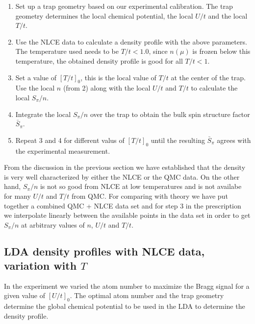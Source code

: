\documentclass[11pt,letter]{article}
\begin{document}
\begin{enumerate}

  \item Set up a trap geometry based on our experimental calibration.  The trap
geometry determines the local chemical potential, the local $U/t$ and the local
$T/t$. 

  \item Use the NLCE data to calculate a density profile with the above
parameters.  The temperature used needs to be $T/t < 1.0$, since $n(\mu)$ is
frozen below this temperature, the obtained density profile is good for all
$T/t<1$. 

  \item Set a value of $[T/t]_{0}$, this is the local value of $T/t$ at the
center of the trap.  Use the local $n$ (from 2) along with the local $U/t$ and
$T/t$ to calculate the local $S_{\pi}/n$.   
 
  \item Integrate the local $S_{\pi}/n$ over the trap to obtain the bulk spin
structure factor $\bar{S}_{\pi}$. 

  \item Repeat 3 and 4 for different valus of $[T/t]_{0}$ until the resulting
$\bar{S}_{\pi}$ agrees with the experimental measurement. 
\end{enumerate}

From the discussion in the previous section we have established that the
density is very well characterized by either the NLCE or the QMC data.   On the
other hand, $S_{\pi}/n$ is not so good from NLCE at low temperatures and is not
availabe for many $U/t$ and $T/t$ from QMC.    For comparing with theory we
have put together a combined QMC + NLCE data set and for step 3 in the
prescription we interpolate linearly between the available points in the data
set in order to get $S_{\pi}/n$ at arbitrary values of $n$, $U/t$ and $T/t$.

\subsection{ LDA density profiles with NLCE data, variation with $T$}

In the experiment we varied the atom number to maximize the Bragg signal for a
given value of $[U/t]_{0}$.   The optimal atom number and the trap geometry
determine the global chemical potential to be used in the LDA to determine the
density profile.
\end{document}
